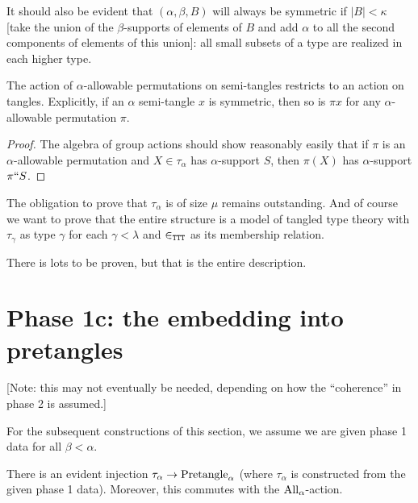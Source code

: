 \begin{lemma}
\label {lem:small-subsets-closure}
\leanok
It should also be evident that $(\alpha,\beta,B)$ will always be symmetric if $|B|<\kappa$ [take the union of the $\beta$-supports of elements of $B$ and add $\alpha$ to all the second components of elements of this union]:  all small subsets of a type are realized in each higher type.
\end{lemma}

\begin{lemma}
  \label{lem:tangle-action}
  \leanok
  The action of $\alpha$-allowable permutations on semi-tangles restricts to an action on tangles.  Explicitly, if an $\alpha$ semi-tangle $x$ is symmetric, then so is $\pi x$ for any $\alpha$-allowable permutation $\pi$.
\end{lemma}
\begin{proof}
  The algebra of group actions should show reasonably easily that if $\pi$ is an $\alpha$-allowable permutation and $X \in \tau_\alpha$ has $\alpha$-support $S$, then $\pi(X)$ has $\alpha$-support $\pi``S$.
\end{proof}

The obligation to prove that $\tau_\alpha$ is of size $\mu$ remains outstanding.  And of course we want to prove that the entire structure is a model of tangled type theory with $\tau_\gamma$ as type $\gamma$ for each $\gamma<\lambda$ and $\in_{\tt TTT}$ as its membership relation.

There is lots to be proven, but that is the entire description.

\section{Phase 1c: the embedding into pretangles}

[Note: this may not eventually be needed, depending on how the “coherence” in phase 2 is assumed.]

For the subsequent constructions of this section, we assume we are given phase 1 data for all $\beta < \alpha$.

\begin{definition}
  \label{def:embedding-into-pretangles}
  \leanok
  There is an evident injection $\tau_\alpha \to \mathrm{Pretangle}_\alpha$ (where $\tau_\alpha$ is constructed from the given phase 1 data).  Moreover, this commutes with the $\mathrm{All}_\alpha$-action.
\end{definition}

